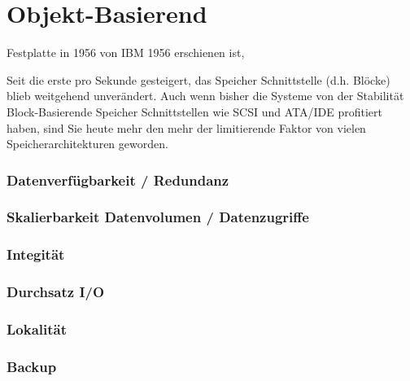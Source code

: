 

\section{Objekt-Basierend}

Festplatte in 1956 von IBM 1956 erschienen ist, 


Seit die erste  pro Sekunde gesteigert, das Speicher Schnittstelle (d.h. Blöcke) blieb weitgehend unverändert. Auch wenn bisher die Systeme von der Stabilität  Block-Basierende Speicher Schnittstellen wie SCSI und ATA/IDE profitiert haben, sind Sie heute mehr den mehr der limitierende Faktor  von vielen Speicherarchitekturen geworden.
\subsubsection{Datenverfügbarkeit / Redundanz}
\subsubsection{Skalierbarkeit Datenvolumen / Datenzugriffe}
\subsubsection{Integität}
\subsubsection{Durchsatz I/O}
\subsubsection{Lokalität}
\subsubsection{Backup}
